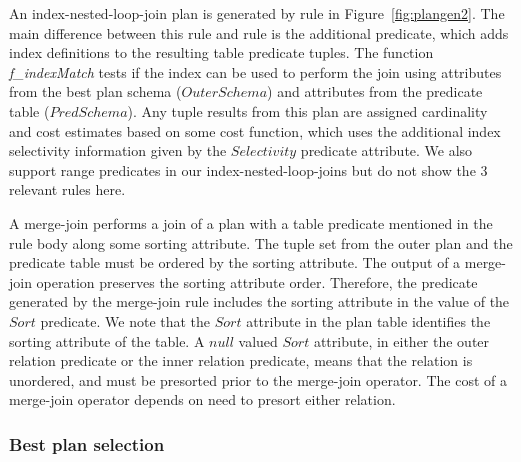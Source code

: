 An index-nested-loop-join plan is generated by rule  in Figure~\ref{fig:plangen2}. The main
difference between this rule and rule  is the additional  predicate, which
adds index definitions to the resulting table predicate tuples. The function {\em f\_indexMatch}
tests if the index can be used to perform the join using attributes from the best plan schema ($OuterSchema$)
and attributes from the predicate table ($PredSchema$). Any tuple results from this plan are assigned 
cardinality and cost estimates based on some cost function, which uses the additional index selectivity
information given by the $Selectivity$  predicate attribute.
We also support range predicates in our index-nested-loop-joins but do
not show the 3 relevant rules here.

A merge-join performs a join of a plan with a table predicate mentioned in the rule body along
some sorting attribute. The tuple set from the outer plan and the predicate table must
be ordered by the sorting attribute. The output of a merge-join operation preserves
the sorting attribute order. Therefore, the  predicate generated by the merge-join rule 
includes the sorting attribute in the value of the $Sort$  predicate. We note that the $Sort$
attribute in the  plan table identifies the sorting attribute of the table.
A $null$ valued $Sort$ attribute, in either the outer relation  predicate or the inner relation
 predicate, means that the relation is unordered, and must be presorted prior to the merge-join operator.  
The cost of a merge-join operator depends on need to presort either relation. 

\subsubsection{Best plan selection}
\label{sec:bestplan}

